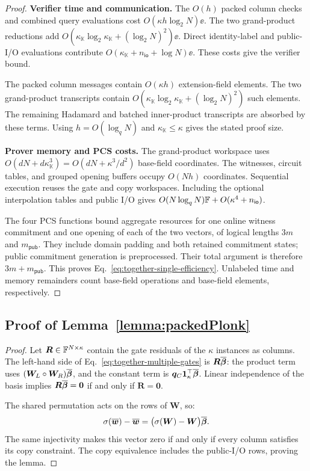 \begin{proof}
\smallskip\noindent\textbf{Verifier time and communication.}
The \(O(h)\) packed column checks and combined query evaluations
cost \(O(\kappa h\log_2N)\ee\).
The two grand-product reductions add
\(O(\kappa_{\mathbb K}\log_2\kappa_{\mathbb K}
+(\log_2N)^2)\ee\).
Direct identity-label and public-I/O evaluations contribute
\(O(\kappa_{\mathbb K}+n_{\mathsf{io}}+\log N)\ee\).
These costs give the verifier bound.

The packed column messages contain \(O(\kappa h)\)
extension-field elements.
The two grand-product transcripts contain
\(O(\kappa_{\mathbb K}\log_2\kappa_{\mathbb K}
+(\log_2N)^2)\) such elements.
The remaining Hadamard and batched inner-product transcripts
are absorbed by these terms.
Using \(h=O(\log_qN)\) and
\(\kappa_{\mathbb K}\leq\kappa\) gives the stated proof size.

\smallskip\noindent\textbf{Prover memory and PCS costs.}
The grand-product workspace uses
\(O(dN+d\kappa_{\mathbb K}^3)
=O(dN+\kappa^3/d^2)\) base-field coordinates.
The witnesses, circuit tables, and grouped opening buffers
occupy \(O(Nh)\) coordinates.
Sequential execution reuses the gate and copy workspaces.
Including the optional interpolation tables and public I/O
gives \(O(N\log_qN){\mathbb{F}}+O(\kappa^4+n_{\mathsf{io}})\).

The four PCS functions bound aggregate resources for one online
witness commitment and one opening of each of the two vectors,
of logical lengths \(3m\) and \(m_{\mathsf{pub}}\).
They include domain padding and both retained commitment states;
public commitment generation is preprocessed.
Their total argument is therefore \(3m+m_{\mathsf{pub}}\).
This proves Eq.~\eqref{eq:together-single-efficiency}.
Unlabeled time and memory remainders count base-field operations
and base-field elements, respectively.
\end{proof}

\subsection{Proof of Lemma~\ref{lemma:packedPlonk}}
\label{appx:proof-packed-plonk}

\begin{proof}
Let \(\bm R\in{\mathbb{F}}^{N\times\kappa}\) contain the gate
residuals of the \(\kappa\) instances as columns.
The left-hand side of Eq.~\eqref{eq:together-multiple-gates}
is \(\bm R\overline{\bm\beta}\): the product term uses
\((\bm W_L\circ\bm W_R)\overline{\bm\beta}\), and the constant
term is \(\bm q_C\bm1_\kappa^\top\overline{\bm\beta}\).
Linear independence of the basis implies
\(\bm R\overline{\bm\beta}=\bm0\) if and only if \(\bm R=\bm0\).

The shared permutation acts on the rows of \(\bm W\), so:
\[
    \sigma(\overline{\bm w})-\overline{\bm w}
       =\bigl(\sigma(\bm W)-\bm W\bigr)\overline{\bm\beta}.
\]
The same injectivity makes this vector zero if and only if
every column satisfies its copy constraint.
The copy equivalence includes the public-I/O rows, proving the lemma.
\end{proof}

